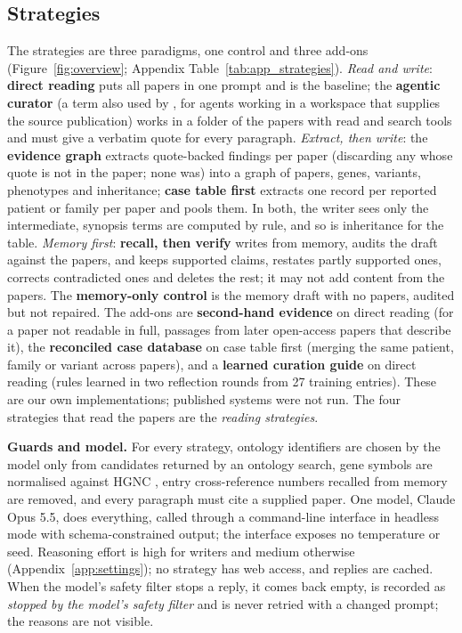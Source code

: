 \documentclass{article} %
\begin{document}
\subsection{Strategies}
\label{sec:strategies}
The strategies are three paradigms, one control and three add-ons (Figure~\ref{fig:overview}; Appendix Table~\ref{tab:app_strategies}). \emph{Read and write}: \textbf{direct reading} puts all papers in one prompt and is the baseline; the \textbf{agentic curator} (a term also used by \citealp{balhoff2026frontier}, for agents working in a workspace that supplies the source publication) works in a folder of the papers with read and search tools and must give a verbatim quote for every paragraph. \emph{Extract, then write}: the \textbf{evidence graph} extracts quote-backed findings per paper (discarding any whose quote is not in the paper; none was) into a graph of papers, genes, variants, phenotypes and inheritance; \textbf{case table first} extracts one record per reported patient or family per paper and pools them. In both, the writer sees only the intermediate, synopsis terms are computed by rule, and so is inheritance for the table. \emph{Memory first}: \textbf{recall, then verify} writes from memory, audits the draft against the papers, and keeps supported claims, restates partly supported ones, corrects contradicted ones and deletes the rest; it may not add content from the papers. The \textbf{memory-only control} is the memory draft with no papers, audited but not repaired. The add-ons are \textbf{second-hand evidence} on direct reading (for a paper not readable in full, passages from later open-access papers that describe it), the \textbf{reconciled case database} on case table first (merging the same patient, family or variant across papers), and a \textbf{learned curation guide} on direct reading (rules learned in two reflection rounds from 27 training entries). These are our own implementations; published systems were not run. The four strategies that read the papers are the \emph{reading strategies}.

\textbf{Guards and model.} For every strategy, ontology identifiers are chosen by the model only from candidates returned by an ontology search, gene symbols are normalised against HGNC \citep{seal2023genenames}, entry cross-reference numbers recalled from memory are removed, and every paragraph must cite a supplied paper. One model, Claude Opus 5.5, does everything, called through a command-line interface in headless mode with schema-constrained output; the interface exposes no temperature or seed. Reasoning effort is high for writers and medium otherwise (Appendix~\ref{app:settings}); no strategy has web access, and replies are cached. When the model's safety filter stops a reply, it comes back empty, is recorded as \emph{stopped by the model's safety filter} and is never retried with a changed prompt; the reasons are not visible.
\end{document}
